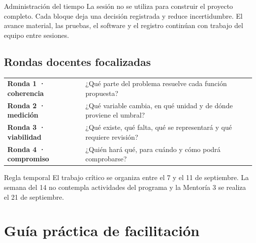 \documentclass[10pt,a4paper]{article}
\begin{document}
\vspace{6mm}
\begin{accentbox}{Administración del tiempo}
La sesión no se utiliza para construir el proyecto completo. Cada bloque deja una decisión registrada y reduce incertidumbre. El avance material, las pruebas, el software y el registro continúan con trabajo del equipo entre sesiones.
\end{accentbox}

\subsection{Rondas docentes focalizadas}
\begin{tabularx}{\textwidth}{@{}p{37mm}Y@{}}
\textbf{Ronda 1 · coherencia} & ¿Qué parte del problema resuelve cada función propuesta? \\
\textbf{Ronda 2 · medición} & ¿Qué variable cambia, en qué unidad y de dónde proviene el umbral? \\
\textbf{Ronda 3 · viabilidad} & ¿Qué existe, qué falta, qué se representará y qué requiere revisión? \\
\textbf{Ronda 4 · compromiso} & ¿Quién hará qué, para cuándo y cómo podrá comprobarse? \\
\end{tabularx}

\begin{navybox}{Regla temporal}
El trabajo crítico se organiza entre el 7 y el 11 de septiembre. La semana del 14 no contempla actividades del programa y la Mentoría 3 se realiza el 21 de septiembre.
\end{navybox}

\newpage
\section{Guía práctica de facilitación}
\end{document}
